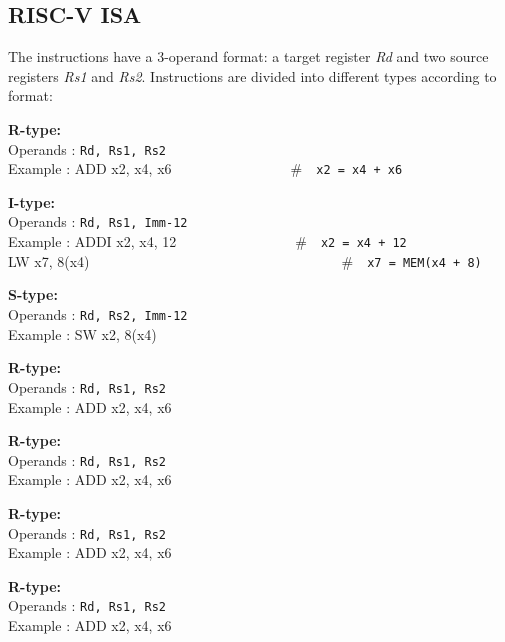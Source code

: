 \subsection{RISC-V ISA}
The instructions have a 3-operand format: a target register \textit{Rd} and two source registers \textit{Rs1} and \textit{Rs2}. Instructions are divided into different types according to format:\\
\begin{description}
	\item \textbf{R-type:}\\
	Operands : \texttt{Rd, Rs1, Rs2}\\
	Example : \textsf{ADD x2, x4, x6}\ \ \ \ \ \ \ \ \ \ \ \ \ \ \ \ \ \#\ \ \texttt{x2 = x4 + x6}\\
	\item \textbf{I-type:}\\
	Operands : \texttt{Rd, Rs1, Imm-12}\\
	Example : \textsf{ADDI x2, x4, 12}\ \ \ \ \ \ \ \ \ \ \ \ \ \ \ \ \ \#\ \ \texttt{x2 = x4 + 12}\\
	\textsf{LW x7, 8(x4)}\ \ \ \ \ \ \ \ \ \ \ \ \ \ \ \ \ \ \ \ \ \ \ \ \ \ \ \ \ \ \ \ \ \ \ \ \#\ \ \texttt{x7 = MEM(x4 + 8)}\\
	\item \textbf{S-type:}\\
	Operands : \texttt{Rd, Rs2, Imm-12}\\
	Example : \textsf{SW x2, 8(x4)}
	\item \textbf{R-type:}\\
	Operands : \texttt{Rd, Rs1, Rs2}\\
	Example : \textsf{ADD x2, x4, x6}
	\item \textbf{R-type:}\\
	Operands : \texttt{Rd, Rs1, Rs2}\\
	Example : \textsf{ADD x2, x4, x6}
	\item \textbf{R-type:}\\
	Operands : \texttt{Rd, Rs1, Rs2}\\
	Example : \textsf{ADD x2, x4, x6}
	\item \textbf{R-type:}\\
	Operands : \texttt{Rd, Rs1, Rs2}\\
	Example : \textsf{ADD x2, x4, x6}
	
\end{description}
